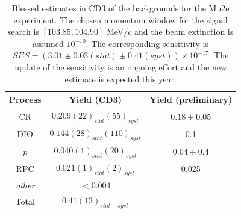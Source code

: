 \documentclass[12pt,a4paper,openright, oneside, titlepage]{book} %
\begin{document}

\begin{table}
\centering
\begin{tabular}{|c|c|c|}
\hline
Process & Yield (CD3) & Yield (preliminary)\\
\hline
\hline
CR	&	$0.209(22)_{stat}(55)_{syst}$ & $0.18\pm0.05$ \cite{CRV_now}\\
\hline
DIO	&	$0.144(28)_{stat}(110)_{syst}$ & 0.1 \cite{DIO_now}\\
\hline
$\overline{p}$	&	$0.040(1)_{stat}(20)_{syst}$ &$0.04 \div 0.4$ \cite{Giovanni:2020}\\
\hline
RPC	&	$0.021(1)_{stat}(2)_{syst}$	& 0.025 \cite{RPC_now} \\
\hline
\textit{other}	& $< 0.004$ &\\
\hline
\hline
Total &	$0.41(13)_{stat+syst}$ &\\
\hline
\end{tabular}
\caption[Mu2e background]{Blessed estimates in CD3 \cite{CD3} of the backgrounds for the Mu2e experiment.
The chosen momentum window for the signal search is $[103.85, 104.90]$ MeV$/c$ and the beam extinction is assumed $10^{-10}$. 
The corresponding sensitivity is $SES=(3.01 \pm 0.03(stat) \pm 0.41(syst)) \times 10^{-17}$. 
The update of the sensitivity is an ongoing effort and the new estimate is expected this year.}
\label{T_backgrounds}
\end{table}
\end{document}
